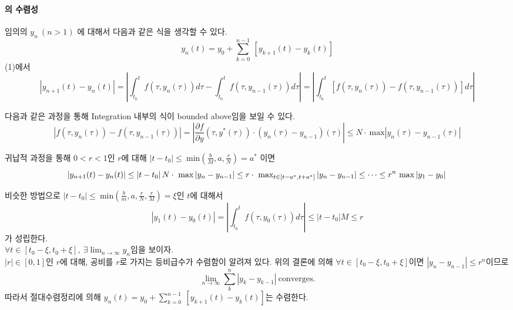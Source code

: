 \documentclass[a4paper,10pt]{article}
\begin{document}
\paragraph{의 수렴성}
임의의 $y_n \ (n > 1)$ 에 대해서 다음과 같은 식을 생각할 수 있다.
\begin{displaymath}
    y_n(t) = y_0 + \sum_{k = 0}^{n-1} \ [y_{k+1}(t) - y_k(t)]
\end{displaymath}
(1)에서
\begin{displaymath}
    \left| y_{n+1}(t) - y_n(t) \right| = \left| \int_{t_0}^{t} f(\tau , y_n(\tau)) d \tau  - \int_{t_0}^{t} f(\tau , y_{n-1}(\tau)) d \tau \right| = \left| \int_{t_0}^{t} [ f(\tau , y_n(\tau) )- f(\tau , y_{n-1}(\tau)) ] d \tau \right|
\end{displaymath}

다음과 같은 과정을 통해 Integration 내부의 식이 bounded above임을 보일 수 있다.
\begin{displaymath}
    |f(\tau , y_n(\tau) )- f(\tau , y_{n-1}(\tau))| = \left| \frac{\partial f}{\partial y}(\tau, y^{*}(\tau)) \cdot (y_n(\tau) - y_{n-1})(\tau)\right| \leq N \cdot \ \text{max}|y_n(\tau) - y_{n-1}(\tau)|
\end{displaymath}

귀납적 과정을 통해 $0 < r < 1$인 $r$에 대해 $|t - t_0| \leq \ \text{min}\left( \frac{b}{M}, a, \frac{r}{N} \right) = a^*$ 이면
   \begin{displaymath}
    \left| y_{n+1}(t) - y_n(t) \right| \leq \left| t - t_0 \right|N \cdot \ \text{max}\left| y_n - y_{n-1} \right| \leq r \cdot \ \text{max}_{t \in [t - a^*, t + a^*]}\left| y_n - y_{n-1} \right| \leq \cdots \leq r^n \ \text{max}\left| y_1 - y_0 \right|\\
\end{displaymath} 


비슷한 방법으로 $|t - t_0| \leq \ \text{min}\left( \frac{b}{m}, a, \frac{r}{N}, \frac{r}{M}\right) = \xi$인 $t$에 대해서
\begin{displaymath}
    \left| y_{1}(t) - y_0(t) \right| = \left| \int_{t_0}^t f(\tau, y_0(\tau))d \tau \right| \leq |t-t_0| M \leq r
\end{displaymath}
가 성립한다.
\\


$\displaystyle{\forall t \in [t_0 - \xi, t_0 + \xi], \ \exists \lim_{n \to \infty} y_n}$임을 보이자.\\

$|r| \in [0,1]$인 $r$에 대해, 공비를 $r$로 가지는 등비급수가 수렴함이 알려져 있다. 위의 결론에 의해 $\displaystyle{\forall t \in [t_0 - \xi, t_0 + \xi]}$이면 $\displaystyle{|y_n - y_{n-1}| \leq r^{n}}$이므로 \begin{displaymath}
    \lim_{n \to \infty} \sum_{k}^{n} \left| y_k - y_{k-1} \right| \ \text{converges.}
\end{displaymath}
따라서 절대수렴정리에 의해 $\displaystyle{y_n(t) = y_0 + \sum_{k = 0}^{n-1} \ \left[y_{k+1}(t) - y_k(t)\right]}$는 수렴한다.\\
\end{document}
